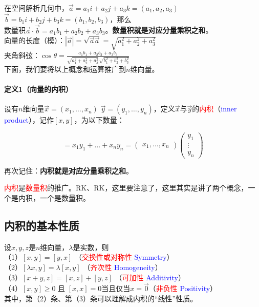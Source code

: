 \documentclass[UTF8]{ctexbook}
\begin{document}
在空间解析几何中，$\vec{a}=a_{1}i+a_{2}j+a_{3}k=(a_{1},a_{2},a_{3})$ \quad $\vec{b}=b_{1}i+b_{2}j+b_{3}k=(b_{1},b_{2},b_{3})$，那么\\
数量积$\vec{a} \cdot \vec{b} = a_{1}b_{1} + a_{2}b_{2} + a_{3}b_{3} $。\textbf{数量积就是对应分量乘积之和}。\\
向量的长度（模）：$|\vec{a}|=\sqrt{\vec{a}\vec{a}}=\sqrt{a_{1}^{2}+a_ {2}^{2}+a_ {3}^{2}}$\\
夹角斜弦：$\cos \theta=\frac{a_{1}b_{1} + a_{2}b_{2} + a_{3}b_{3}}{\sqrt{a_{1}^{2}+a_ {2}^{2}+a_ {3}^{2}}\sqrt{b_{1}^{2}+b_ {2}^{2}+b_ {3}^{2}}}$\\

下面，我们要将以上概念和运算推广到$n$维向量。

\paragraph{定义1（向量的内积）}设有$n$维向量$\vec{x}=(x_{1},\dots,x_{n})$ \quad $\vec{y}=(y_{1},\dots,y_{n})$，定义$\vec{x}$与$\vec{y}$的\textcolor{red}{内积}（\textcolor{blue}{inner product}），记作$[x,y]$，为以下数量：

\begin{displaymath}
[x,y]=x_{1}y_{1}+\dots+x_{n}y_{n}=
\begin{pmatrix} x_{1},\dots,x_{n} \end{pmatrix}
\begin{pmatrix} y_{1} \\ \vdots \\ y_{n} \end{pmatrix}
\end{displaymath}

再次记住：\textbf{内积就是对应分量乘积之和}。

\textcolor{red}{内积}是\textcolor{red}{数量积}的推广。RK、RK，这里要注意了，这里其实是讲了两个概念，一个是内积，一个是数量积。

\subsection{内积的基本性质}

设$x,y,z$是$n$维向量，$\lambda$是实数，则\\
（1）$[x,y]=[y,x]$ （\textcolor{red}{交换性或对称性} \textcolor{blue}{Symmetry}）\\
（2）$[\lambda x,y]=\lambda [x,y]$ （\textcolor{red}{齐次性} \textcolor{blue}{Homogeneity}）\\
（3）$[x+y,z]=[x,z]+[y,z]$ （\textcolor{red}{可加性} \textcolor{blue}{Additivity}）\\
（4）$[x,y] \geq 0$ 且 $[x,x]=0$当且仅当$x=\vec{0}$（\textcolor{red}{非负性} \textcolor{blue}{Positivity}）\\
其中，第（2）条、第（3）条可以理解成内积的“线性”性质。
\end{document}
